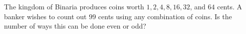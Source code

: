 The kingdom of Binaria produces coins worth $1, 2, 4, 8, 16, 32$, and $64$ cents. A banker wishes to count out $99$ cents using any combination of coins. Is the number of ways this can be done even or odd?
